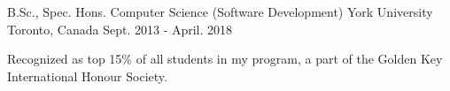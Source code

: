


\begin{cventries}


\cventry
{B.Sc., Spec. Hons. Computer Science (Software Development)} %
{York University} %
{Toronto, Canada} %
{Sept. 2013 - April. 2018} %
{ %
\begin{cvitems}
\item{Recognized as top 15\% of all students in my program, a part of the Golden Key International Honour Society.}
\end{cvitems}
}


\end{cventries}